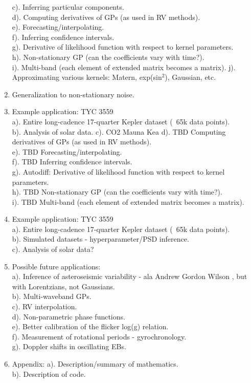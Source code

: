 \documentclass[manuscript, letterpaper]{aastex6}
\begin{document}
\begin{enumerate}
  c). Inferring particular components.\\
  d). Computing derivatives of GPs (as used in RV methods).\\
  e). Forecasting/interpolating.\\
  f). Inferring confidence intervals.\\
  g). Derivative of likelihood function with respect to kernel parameters.\\
  h). Non-stationary GP (can the coefficients vary with time?).\\
  i). Multi-band (each element of extended matrix becomes a matrix).
  j). Approximating various kernels: Matern, exp(sin$^2$), Gaussian, etc.
\item Generalization to non-stationary noise.
\item Example application: TYC 3559\\
  a). Entire long-cadence 17-quarter Kepler dataset (~65k data points).\\
  b). Analysis of solar data.
  c). CO2 Mauna Kea
  d). TBD Computing derivatives of GPs (as used in RV methods).\\
  e). TBD Forecasting/interpolating.\\
  f). TBD Inferring confidence intervals.\\
  g). Autodiff: Derivative of likelihood function with respect to kernel parameters.\\
  h). TBD Non-stationary GP (can the coefficients vary with time?).\\
  i). TBD Multi-band (each element of extended matrix becomes a matrix).

\item Example application: TYC 3559\\
  a). Entire long-cadence 17-quarter Kepler dataset (~65k data points).\\
  b). Simulated datasets - hyperparameter/PSD inference.\\
  c). Analysis of solar data?

\item Possible future applications:\\
  a). Inference of asteroseismic variability - ala Andrew Gordon Wilson \citep{2013arXiv1302.4245W}, but
      with Lorentzians, not Gaussians.\\
  b). Multi-waveband GPs.\\
  c). RV interpolation.\\
  d). Non-parametric phase functions.\\
  e). Better calibration of the flicker log(g) relation.\\
  f). Measurement of rotational periods - gyrochronology.\\
  g). Doppler shifts in oscillating EBs.

\item Appendix:
  a). Description/summary of mathematics.\\
  b). Description of code.
\end{enumerate}
\end{document}
